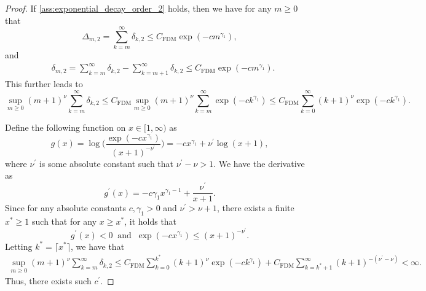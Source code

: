 \documentclass[11pt]{article}
\theoremstyle{plain}
\theoremstyle{definition}
\begin{document}
\begin{proof}
    If \eqref{ass:exponential_decay_order_2} holds, then we have for any $m \geq 0$ that 
    \begin{equation*}
        \Delta_{m,2} = \sum_{k = m}^{\infty}\delta_{k,2} \leq C_{\mathrm{FDM}}\exp(-cm^{\gamma_1}),
    \end{equation*}
    and
    \begin{equation*}
    \begin{aligned}
        &\delta_{m,2} = \sum_{k = m}^{\infty}\delta_{k,2} - \sum_{k = m+1}^{\infty}\delta_{k,2} \leq C_{\mathrm{FDM}}\exp(-cm^{\gamma_1}).
    \end{aligned}
    \end{equation*}
    This further leads to
    \begin{equation}\label{eq:DAN_poly_nu_2}
        \sup_{m \geq 0}(m+1)^{\nu}\sum_{k = m}^{\infty}\delta_{k,2} \leq C_{\mathrm{FDM}}\sup_{m \geq 0}(m+1)^{\nu}\sum_{k = m}^{\infty}\exp(-ck^{\gamma_1}) \leq C_{\mathrm{FDM}}\sum_{k = 0}^{\infty}(k+1)^{\nu}\exp(-ck^{\gamma_1}).
    \end{equation}

Define the following function on $x \in [1, \infty)$ as
\begin{equation*}
    g(x) = \log\bigg(\frac{\exp(-cx^{\gamma_1})}{(x+1)^{-\nu^{\prime}}}\bigg) = -cx^{\gamma_1} + \nu^{\prime}\log(x+1),
\end{equation*}
where $\nu^{\prime}$ is some absolute constant such that $\nu^{\prime} - \nu > 1$. 
We have the derivative as
\begin{equation*}
    g^{\prime}(x) = -c\gamma_1x^{\gamma_1-1} + \frac{\nu^{\prime}}{x+1}.
\end{equation*}
Since for any absolute constants $c, \gamma_1 > 0$ and $\nu^{\prime} > \nu + 1$, there exists a finite $x^* \geq 1$ such that for any $x \geq x^*$, it holds that
\begin{equation*}
    g^{\prime}(x) < 0 \;\; \text{and} \;\; \exp(-cx^{\gamma_1}) \leq (x+1)^{-\nu^{\prime}}.
\end{equation*}
Letting $k^* = \lceil x^* \rceil$, we have that
\begin{equation*}
\begin{aligned}
    \sup_{m \geq 0}(m+1)^{\nu}\sum_{k = m}^{\infty}\delta_{k,2} \leq C_{\mathrm{FDM}}\sum_{k = 0}^{k^*}(k+1)^{\nu}\exp(-ck^{\gamma_1}) + C_{\mathrm{FDM}}\sum_{k = k^*+1}^{\infty}(k+1)^{-(\nu^{\prime}-\nu)}< \infty.
\end{aligned}
\end{equation*}
Thus, there exists such $c^{\prime}$.
\end{proof}
\end{document}
